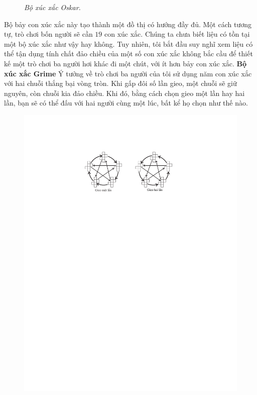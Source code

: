\begin{multicols}{2}
\begin{figure}[H]
		\caption{\small\textit{\color{quantoan}Bộ xúc xắc Oskar.}}
		\vspace*{-10pt}
	\end{figure}
	Bộ bảy con xúc xắc này tạo thành một đồ thị có hướng đầy đủ. Một cách tương tự, trò chơi bốn người sẽ cần $19$ con xúc xắc. Chúng ta chưa biết liệu có tồn tại một bộ xúc xắc như vậy hay không.
	\vskip 0.05cm
	Tuy nhiên, tôi bắt đầu suy nghĩ xem liệu có thể tận dụng tính chất đảo chiều của một số con xúc xắc không bắc cầu để thiết kế một trò chơi ba người hơi khác đi một chút, với ít hơn bảy con xúc xắc.
	\vskip 0.1cm
	\textbf{\color{quantoan}Bộ xúc xắc Grime}
	\vskip 0.1cm
	Ý tưởng về trò chơi ba người của tôi sử dụng năm con xúc xắc với hai chuỗi thắng bại vòng tròn. Khi gấp đôi số lần gieo, một chuỗi sẽ giữ nguyên, còn chuỗi kia đảo chiều. Khi đó, bằng cách chọn gieo một lần hay hai lần, bạn sẽ có thể đấu với hai người cùng một lúc, bất kể họ chọn như thế nào.
	\begin{figure}[H]
		\vspace*{-10pt}
		\centering
		\captionsetup{labelformat= empty, justification=centering}
		\includegraphics[width = 1\linewidth]{9}

\end{figure}
\end{multicols}
